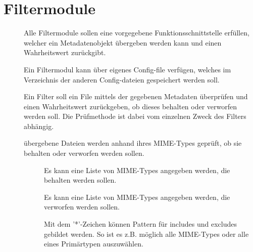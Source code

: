 \section{Filtermodule}
\begin{description}
	\item []
		Alle Filtermodule sollen eine vorgegebene Funktionsschnittstelle erfüllen, 
		welcher ein Metadatenobjekt übergeben werden kann und einen Wahrheitswert zurückgibt.
	\item []
		Ein Filtermodul kann über eigenes Config-file verfügen, welches im Verzeichnis
		der anderen Config-dateien gespeichert werden soll.
	\item []
		Ein Filter soll ein File mittels der gegebenen Metadaten überprüfen und 
		einen Wahrheitswert zurückgeben,
		ob dieses behalten oder verworfen werden soll.
		Die Prüfmethode ist dabei vom einzelnen Zweck des Filters abhängig.
	\item []
		übergebene Dateien werden anhand ihres MIME-Types geprüft, ob sie behalten oder verworfen werden sollen.
		\begin{description}
			\item []
				Es kann eine Liste von MIME-Types angegeben werden, die behalten werden sollen. 
			\item []
				Es kann eine Liste von MIME-Types angegeben werden, die verworfen werden sollen. 
			\item []
				Mit dem '*'-Zeichen können Pattern für includes und excludes gebildet werden. 
				So ist es z.B. möglich alle MIME-Types oder alle eines Primärtypen auszuwählen.
		\end{description}
\end{description}

